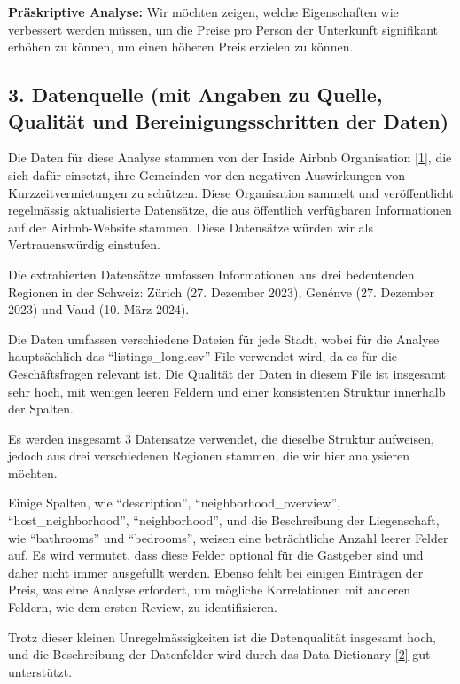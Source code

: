 \documentclass[
  journal,
]{IEEEtran}%
\begin{document}
\textbf{Präskriptive Analyse:} Wir möchten zeigen, welche Eigenschaften
wie verbessert werden müssen, um die Preise pro Person der Unterkunft
signifikant erhöhen zu können, um einen höheren Preis erzielen zu
können.

\hypertarget{datenquelle-mit-angaben-zu-quelle-qualituxe4t-und-bereinigungsschritten-der-daten}{%
\subsection{3. Datenquelle (mit Angaben zu Quelle, Qualität und
Bereinigungsschritten der
Daten)}\label{datenquelle-mit-angaben-zu-quelle-qualituxe4t-und-bereinigungsschritten-der-daten}}

Die Daten für diese Analyse stammen von der Inside Airbnb Organisation
\protect\hyperlink{ref-inside-airbnb-2023}{{[}1{]}}, die sich dafür
einsetzt, ihre Gemeinden vor den negativen Auswirkungen von
Kurzzeitvermietungen zu schützen. Diese Organisation sammelt und
veröffentlicht regelmässig aktualisierte Datensätze, die aus öffentlich
verfügbaren Informationen auf der Airbnb-Website stammen. Diese
Datensätze würden wir als Vertrauenswürdig einstufen.

Die extrahierten Datensätze umfassen Informationen aus drei bedeutenden
Regionen in der Schweiz: Zürich (27. Dezember 2023), Genénve (27.
Dezember 2023) und Vaud (10. März 2024).

Die Daten umfassen verschiedene Dateien für jede Stadt, wobei für die
Analyse hauptsächlich das ``listings\_long.csv''-File verwendet wird, da
es für die Geschäftsfragen relevant ist. Die Qualität der Daten in
diesem File ist insgesamt sehr hoch, mit wenigen leeren Feldern und
einer konsistenten Struktur innerhalb der Spalten.

Es werden insgesamt 3 Datensätze verwendet, die dieselbe Struktur
aufweisen, jedoch aus drei verschiedenen Regionen stammen, die wir hier
analysieren möchten.

Einige Spalten, wie ``description'', ``neighborhood\_overview'',
``host\_neighborhood'', ``neighborhood'', und die Beschreibung der
Liegenschaft, wie ``bathrooms'' und ``bedrooms'', weisen eine
beträchtliche Anzahl leerer Felder auf. Es wird vermutet, dass diese
Felder optional für die Gastgeber sind und daher nicht immer ausgefüllt
werden. Ebenso fehlt bei einigen Einträgen der Preis, was eine Analyse
erfordert, um mögliche Korrelationen mit anderen Feldern, wie dem ersten
Review, zu identifizieren.

Trotz dieser kleinen Unregelmässigkeiten ist die Datenqualität insgesamt
hoch, und die Beschreibung der Datenfelder wird durch das Data
Dictionary \protect\hyperlink{ref-inside-airbnb-2022}{{[}2{]}} gut
unterstützt.
\end{document}
